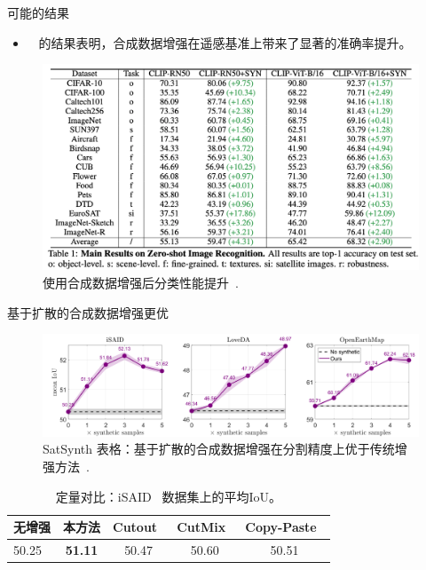   
\begin{refsection}
  \begin{frame}{可能的结果}
    \begin{itemize}
      \item ~\parencite{heSYNTHETICDATAGENERATIVE2022} 的结果表明，合成数据增强在遥感基准上带来了显著的准确率提升。
    \end{itemize}
    \begin{figure}
      \centering
      \includegraphics[width=0.70\linewidth]{figs/syn_aug_results.png}
      \caption{\scriptsize 使用合成数据增强后分类性能提升~\parencite{heSYNTHETICDATAGENERATIVE2022}.}
    \end{figure}
    \bottomleftrefs
  \end{frame}
  \end{refsection}

  \begin{refsection}
    \begin{frame}{基于扩散的合成数据增强更优}
      \begin{figure}
        \centering
        \includegraphics[width=0.7\linewidth]{figs/satsynth_comparison.png}
        \caption{\scriptsize SatSynth 表格：基于扩散的合成数据增强在分割精度上优于传统增强方法~\parencite{tokerSatSynthAugmentingImageMask2024}.}
      \end{figure}
      \vspace{-2.5em}
      \begin{table}[]
        \centering
        \caption[]{\scriptsize 定量对比：iSAID~\parencite{waqas2019isaid} 数据集上的平均IoU。}
        \scriptsize
        \setlength{\tabcolsep}{2.5pt}
        \begin{tabular}{@{}l|cccc@{}}
        \toprule
        \textbf{无增强} & \textbf{本方法} & \textbf{Cutout~\parencite{devriesImprovedRegularizationConvolutional2017}} & \textbf{CutMix~\parencite{yunCutmixRegularizationStrategy2019}} & \textbf{Copy-Paste~\parencite{ghiasiSimpleCopyPasteStrong2021}} \\
        \midrule
        50.25 & \textbf{51.11} & 50.47 & 50.60 & 50.51 \\
        \bottomrule
        \end{tabular}
      \end{table}
    
      \bottomleftrefs
    \end{frame}
    \end{refsection}
    
